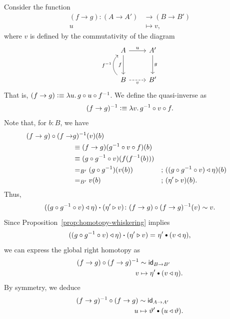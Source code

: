 \begin{solution}
\begin{enumerate}[a),font=\upshape]
\begin{enumerate}
            Consider the function
            \begin{align*}
                (f\to g)\colon(A\to A')&\to(B\to B')\\
                u&\mapsto v,
            \end{align*}
            where $v$ is defined by the commutativity of the diagram
            \[
                \begin{tikzcd}[row sep=large]
                    A
                        \arrow[r,"u"]
                        \arrow[d,"f"']
                    &A'
                        \arrow[d,"g"]\\
                    B
                        \arrow[r,"v"',dashed]
                        \arrow[u,"f^{-1}",bend left=50]
                    &B'
                \end{tikzcd}
            \]
            That is, $(f\to g)\mathrel{\vcentcolon}\equiv\lambda u.\,g\circ u\circ f^{-1}$. We define the quasi-inverse as
            \[
                 (f\to g)^{-1}\mathrel{\vcentcolon}\equiv\lambda v.\,g^{-1}\circ v\circ f.
            \]
            Note that, for $b\colon B$, we have
            \begin{align*}
                (f\to g)\circ(f\to&g)^{-1}(v)(b)\\
                    &\equiv(f\to g)(g^{-1}\circ v\circ f)(b)\\
                    &\equiv(g\circ g^{-1}\circ v)(f(f^{-1}(b)))\\
                    &\mathrel{=_{B'}}(g\circ g^{-1})(v(b))
                        &&\text{; }((g\circ g^{-1}\circ v)\triangleleft\eta)(b)\\
                    &\mathrel{=_{B'}}v(b)
                        &&\text{; }(\eta'\triangleright v)(b).
            \end{align*}
            Thus,
            \[
                ((g\circ g^{-1}\circ v)\lwct\eta)\ct(\eta'\rwct v)
                \colon(f\to g)\circ(f\to g)^{-1}(v)\sim v.
            \]
            Since Proposition~\ref{prop:homotopy-whiskering} implies
            \begin{align*}
                ((g\circ g^{-1}\circ v)\lwct\eta)\ct(\eta'\rwct v)
                \eq{}\eta'\hct(v\lwct\eta),
            \end{align*}
            we can express the global right homotopy as
            \begin{align*}
                (f\to g)\circ(f\to g)^{-1}&\sim\id_{B\to B'}\\
                v&\mapsto\eta'\hct(v\lwct\eta).
            \end{align*}
            By symmetry, we deduce
            \begin{align*}
                (f\to g)^{-1}\circ(f\to g)&\sim\id_{A\to A'}\\
                u&\mapsto\vartheta'\hct(u\lwct\vartheta).
            \end{align*}
            

\end{enumerate}
\end{enumerate}
\end{solution}
